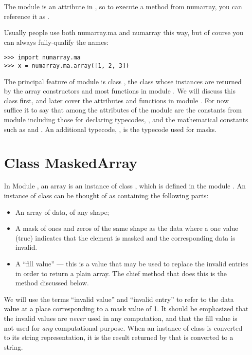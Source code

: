 The \module{\numarray} module is an attribute in , so to
execute a method  from numarray, you can reference it as
.

Usually people use both numarray.ma and numarray this way, but of course you can
always fully-qualify the names:
\begin{verbatim}
>>> import numarray.ma
>>> x = numarray.ma.array([1, 2, 3])
\end{verbatim}

The principal feature of module  is class
, the class whose instances are returned by the array
constructors and most functions in module . We will discuss
this class first, and later cover the attributes and functions in module
. For now suffice it to say that among the attributes of
the module are the constants from module \module{\numarray} including those for
declaring typecodes, , and the mathematical constants such as
 and .  An additional typecode, , is
the typecode used for masks.


\section{Class MaskedArray}
\label{sec:numarray.ma:class-maskedarray}

In Module , an array is an instance of class
, which is defined in the module . An
instance of class  can be thought of as containing the
following parts:
\begin{itemize}
\item An array of data, of any shape;
\item A mask of ones and zeros of the same shape as the data where a one value
  (true) indicates that the element is masked and the corresponding data is
  invalid.
\item A ``fill value'' --- this is a value that may be used to replace the
   invalid entries in order to return a plain \module{\numarray} array. The
   chief method that does this is the method  discussed below.
\end{itemize}
We will use the terms ``invalid value'' and ``invalid entry'' to refer to the
data value at a place corresponding to a mask value of 1. It should be
emphasized that the invalid values are \emph{never} used in any computation,
and that the fill value is not used for \emph{any} computational purpose. When
an instance  of class  is converted to its string
representation, it is the result returned by  that is converted
to a string.


